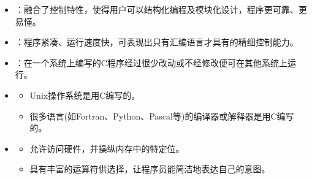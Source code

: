 \begin{frame}
  \begin{free}[C的地位]{}

  \end{free}

\end{frame}


\begin{frame}
  \begin{free}[C语言的优点]{}
  \begin{itemize}
  \item {}：融合了控制特性，使得用户可以结构化编程及模块化设计，程序更可靠、更易懂。\\[0.05in]
    
  \item {}：程序紧凑、运行速度快，可表现出只有汇编语言才具有的精细控制能力。\\[0.05in] 
    
  \item {}：在一个系统上编写的C程序经过很少改动或不经修改便可在其他系统上运行。\\[0.05in]
    
  \item {}
    \begin{itemize}
    \item  Unix操作系统是用C编写的。  
    \item  很多语言(如Fortran、Python、Pascal等)的编译器或解释器是用C编写的。
    \end{itemize} \vspace{.05in}

  \item {}
    \begin{itemize}
    \item 允许访问硬件，并操纵内存中的特定位。 
    \item 具有丰富的运算符供选择，让程序员能简洁地表达自己的意图。
    \end{itemize}
  \end{itemize}
  \end{free}
\end{frame}


